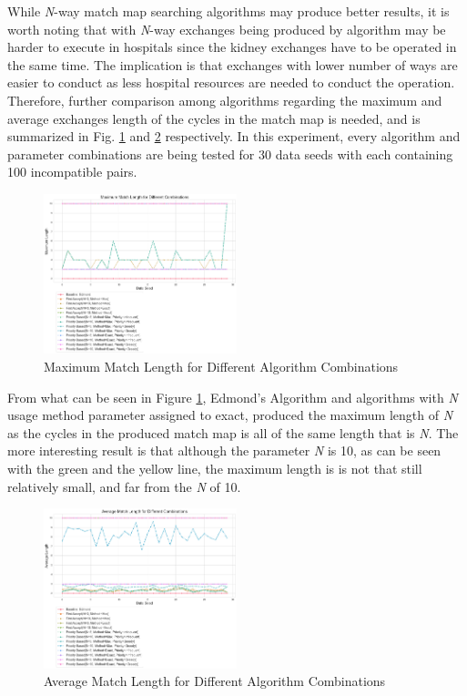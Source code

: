 \documentclass[conference]{IEEEtran}
\begin{document}
While \textit{N}-way match map searching algorithms may produce better results, it is worth noting that with \textit{N}-way exchanges
being produced by algorithm may be harder to execute in hospitals since the kidney exchanges have to be operated in the same time. The
implication is that exchanges with lower number of ways are easier to conduct as less hospital resources are needed to conduct the operation.
Therefore, further comparison among algorithms regarding the maximum and average exchanges length of the cycles in the match map is needed, and
is summarized in Fig. \ref{figuremaxlength} and \ref{figureavglength} respectively.
In this experiment, every algorithm and parameter combinations are being tested for 30 data seeds with each containing 100 incompatible pairs. 

\begin{figure}[h]
   \includegraphics[width=0.5\textwidth]{images/maximum_match_length_for_different_combinations.png}
   \caption{Maximum Match Length for Different Algorithm Combinations}
   \label{figuremaxlength}
\end{figure}

From what can be seen in Figure \ref{figuremaxlength}, Edmond's Algorithm and algorithms with \textit{N} usage method parameter assigned to exact, produced the maximum
length of \textit{N} as the cycles in the produced match map is all of the same length that is \textit{N}.
The more interesting result is that although the parameter \textit{N} is 10, as can be seen with the green and the yellow line, the maximum length is
is not that still relatively small, and far from the \textit{N} of 10. 

\begin{figure}[h]
    \includegraphics[width=0.5\textwidth]{images/average_match_length_for_different_combinations.png}
    \caption{Average Match Length for Different Algorithm Combinations}
    \label{figureavglength}
\end{figure}
\end{document}
